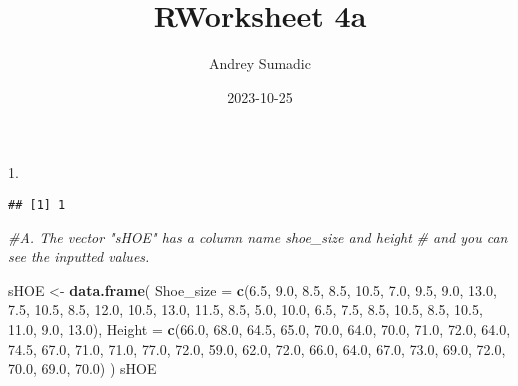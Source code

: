 \documentclass[
]{article}
\title{RWorksheet 4a}
\author{Andrey Sumadic}
\date{2023-10-25}
\newenvironment{Shaded}{\begin{snugshade}}{\end{snugshade}}
\newcommand{\AttributeTok}[1]{\textcolor[rgb]{0.13,0.29,0.53}{#1}}
\newcommand{\CommentTok}[1]{\textcolor[rgb]{0.56,0.35,0.01}{\textit{#1}}}
\newcommand{\FloatTok}[1]{\textcolor[rgb]{0.00,0.00,0.81}{#1}}
\newcommand{\FunctionTok}[1]{\textcolor[rgb]{0.13,0.29,0.53}{\textbf{#1}}}
\newcommand{\NormalTok}[1]{#1}
\newcommand{\OtherTok}[1]{\textcolor[rgb]{0.56,0.35,0.01}{#1}}
\begin{document}
\maketitle

\begin{Shaded}
\begin{Highlighting}[]
\FloatTok{1.} 
\end{Highlighting}
\end{Shaded}

\begin{verbatim}
## [1] 1
\end{verbatim}

\begin{Shaded}
\begin{Highlighting}[]
\CommentTok{\#A. The vector "sHOE" has a column name   shoe\_size and height}
\CommentTok{\#   and you can see the inputted values.}

\NormalTok{sHOE }\OtherTok{\textless{}{-}} \FunctionTok{data.frame}\NormalTok{(}
  \AttributeTok{Shoe\_size =} \FunctionTok{c}\NormalTok{(}\FloatTok{6.5}\NormalTok{, }\FloatTok{9.0}\NormalTok{, }\FloatTok{8.5}\NormalTok{, }\FloatTok{8.5}\NormalTok{, }\FloatTok{10.5}\NormalTok{, }\FloatTok{7.0}\NormalTok{, }\FloatTok{9.5}\NormalTok{, }\FloatTok{9.0}\NormalTok{, }\FloatTok{13.0}\NormalTok{, }\FloatTok{7.5}\NormalTok{, }\FloatTok{10.5}\NormalTok{, }\FloatTok{8.5}\NormalTok{, }\FloatTok{12.0}\NormalTok{, }\FloatTok{10.5}\NormalTok{, }\FloatTok{13.0}\NormalTok{, }\FloatTok{11.5}\NormalTok{, }\FloatTok{8.5}\NormalTok{, }\FloatTok{5.0}\NormalTok{, }\FloatTok{10.0}\NormalTok{, }\FloatTok{6.5}\NormalTok{, }\FloatTok{7.5}\NormalTok{, }\FloatTok{8.5}\NormalTok{, }\FloatTok{10.5}\NormalTok{, }\FloatTok{8.5}\NormalTok{, }\FloatTok{10.5}\NormalTok{, }\FloatTok{11.0}\NormalTok{, }\FloatTok{9.0}\NormalTok{, }\FloatTok{13.0}\NormalTok{),}
  \AttributeTok{Height =} \FunctionTok{c}\NormalTok{(}\FloatTok{66.0}\NormalTok{, }\FloatTok{68.0}\NormalTok{, }\FloatTok{64.5}\NormalTok{, }\FloatTok{65.0}\NormalTok{, }\FloatTok{70.0}\NormalTok{, }\FloatTok{64.0}\NormalTok{, }\FloatTok{70.0}\NormalTok{, }\FloatTok{71.0}\NormalTok{, }\FloatTok{72.0}\NormalTok{, }\FloatTok{64.0}\NormalTok{, }\FloatTok{74.5}\NormalTok{, }\FloatTok{67.0}\NormalTok{, }\FloatTok{71.0}\NormalTok{, }\FloatTok{71.0}\NormalTok{, }\FloatTok{77.0}\NormalTok{, }\FloatTok{72.0}\NormalTok{, }\FloatTok{59.0}\NormalTok{, }\FloatTok{62.0}\NormalTok{, }\FloatTok{72.0}\NormalTok{, }\FloatTok{66.0}\NormalTok{, }\FloatTok{64.0}\NormalTok{, }\FloatTok{67.0}\NormalTok{, }\FloatTok{73.0}\NormalTok{, }\FloatTok{69.0}\NormalTok{, }\FloatTok{72.0}\NormalTok{, }\FloatTok{70.0}\NormalTok{, }\FloatTok{69.0}\NormalTok{, }\FloatTok{70.0}\NormalTok{)}
\NormalTok{)}
\NormalTok{sHOE}
\end{Highlighting}
\end{Shaded}
\end{document}
